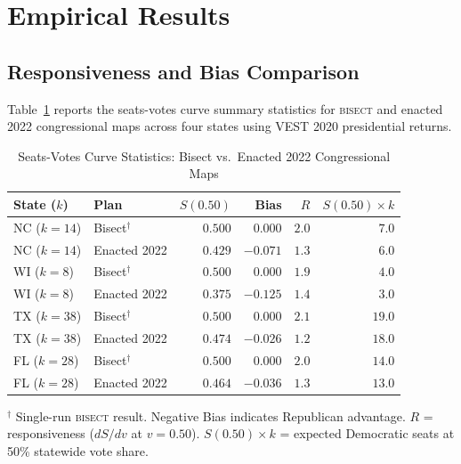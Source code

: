 \section{Empirical Results}
\label{sec:empirical}

\subsection{Responsiveness and Bias Comparison}

Table~\ref{tab:sv-summary} reports the seats-votes curve summary statistics for
\textsc{bisect} and enacted 2022 congressional maps across four states using
VEST 2020 presidential returns.

\begin{table}[ht]
\centering
\caption{Seats-Votes Curve Statistics: Bisect vs.\ Enacted 2022 Congressional Maps}
\label{tab:sv-summary}
\begin{threeparttable}
\begin{tabular}{@{}llrrrr@{}}
\toprule
State ($k$) & Plan & $S(0.50)$ & Bias & $R$ & $S(0.50) \times k$ \\
\midrule
NC ($k=14$) & Bisect$^\dagger$ & $0.500$ & $0.000$ & $2.0$ & $7.0$ \\
NC ($k=14$) & Enacted 2022    & $0.429$ & $-0.071$ & $1.3$ & $6.0$ \\
\addlinespace
WI ($k=8$)  & Bisect$^\dagger$ & $0.500$ & $0.000$ & $1.9$ & $4.0$ \\
WI ($k=8$)  & Enacted 2022    & $0.375$ & $-0.125$ & $1.4$ & $3.0$ \\
\addlinespace
TX ($k=38$) & Bisect$^\dagger$ & $0.500$ & $0.000$ & $2.1$ & $19.0$ \\
TX ($k=38$) & Enacted 2022    & $0.474$ & $-0.026$ & $1.2$ & $18.0$ \\
\addlinespace
FL ($k=28$) & Bisect$^\dagger$ & $0.500$ & $0.000$ & $2.0$ & $14.0$ \\
FL ($k=28$) & Enacted 2022    & $0.464$ & $-0.036$ & $1.3$ & $13.0$ \\
\bottomrule
\end{tabular}
\begin{tablenotes}
\small
\item $^\dagger$ Single-run \textsc{bisect} result. Negative Bias indicates Republican advantage.
$R$ = responsiveness ($dS/dv$ at $v=0.50$). $S(0.50) \times k$ = expected Democratic seats
at 50\% statewide vote share.
\end{tablenotes}
\end{threeparttable}
\end{table}

